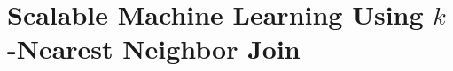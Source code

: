 \section{Scalable Machine Learning Using $k$-Nearest Neighbor Join}\label{subchap:1_2}

\graphicspath{{SpringerJournalOfBigData/}}






